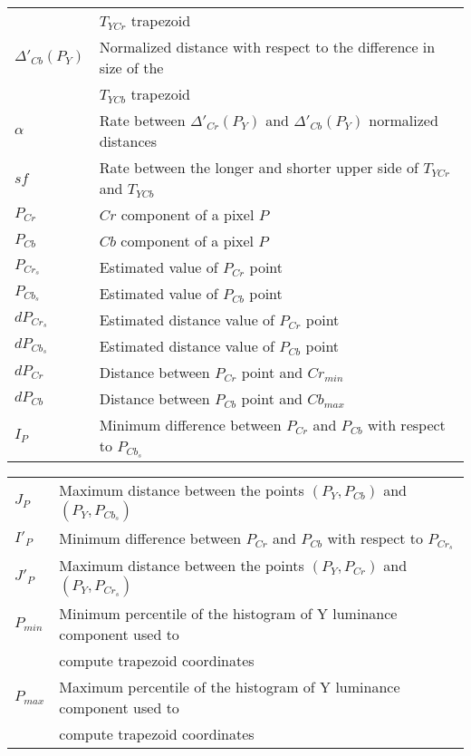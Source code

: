 \documentclass[12pt,twoside,a4paper]{book}
\theoremstyle{plain}
\theoremstyle{definition}
\begin{document}
\begin{tabular}{ll}
                       &$T_{YCr}$ trapezoid \\
    $\Delta'_{Cb}(P_Y)$& Normalized distance with respect to the difference in size of the \\
                       &$T_{YCb}$ trapezoid \\
    $\alpha$    & Rate between $\Delta'_{Cr}(P_Y)$ and $\Delta'_{Cb}(P_Y)$ normalized distances \\
    $sf$        & Rate between the longer and shorter upper side of $T_{YCr}$ and $T_{YCb}$ \\
    $P_{Cr}$    & $Cr$ component of a pixel $P$ \\
    $P_{Cb}$    & $Cb$ component of a pixel $P$ \\
    $P_{Cr_{s}}$& Estimated value of $P_{Cr}$ point \\
    $P_{Cb_{s}}$& Estimated value of $P_{Cb}$ point \\
    $dP_{Cr_{s}}$& Estimated distance value of $P_{Cr}$ point \\
    $dP_{Cb_{s}}$& Estimated distance value of $P_{Cb}$ point \\
    $dP_{Cr}$   & Distance between $P_{Cr}$ point and $Cr_{min}$ \\
    $dP_{Cb}$   & Distance between $P_{Cb}$ point and $Cb_{max}$ \\
    $I_P$       & Minimum difference between $P_{Cr}$ and $P_{Cb}$ with respect to $P_{Cb_s}$ \\
\end{tabular}
\clearpage
\begin{tabular}{ll}
    $J_P$       & Maximum distance between the points $(P_Y, P_{Cb})$ and $(P_Y, P_{Cb_s})$ \\
    $I'_P$      & Minimum difference between $P_{Cr}$ and $P_{Cb}$ with respect to $P_{Cr_s}$ \\
    $J'_P$      & Maximum distance between the points $(P_Y, P_{Cr})$ and $(P_Y, P_{Cr_s})$ \\
    $P_{min}$   & Minimum percentile of the histogram of Y luminance component used to \\
                & compute trapezoid coordinates \\
    $P_{max}$   & Maximum percentile of the histogram of Y luminance component used to \\
                & compute trapezoid coordinates \\
\end{tabular}
\listoffigures            
\listoftables            
\end{document}

